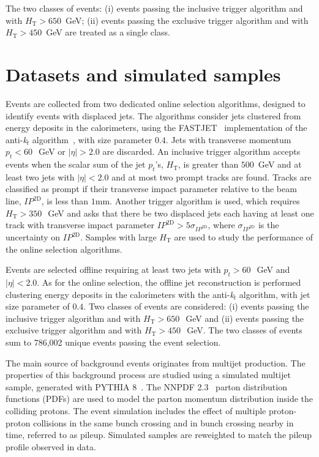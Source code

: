 The two classes of events: (i) events passing the inclusive trigger
algorithm and with $H_{\textrm{T}}>650$~GeV; (ii) events passing the
exclusive trigger algorithm and with $H_{\textrm{T}}>450$~GeV are
treated as a single class.  



\section{Datasets and simulated samples}
\label{sec:samples}

Events are collected from two dedicated online selection algorithms,
designed to identify events with displaced jets.  The algorithms
consider jets clustered from energy deposits in the calorimeters,
using the FASTJET~\cite{fastjet} implementation of the
anti-\textit{k}$_{\textit{t}}$ algorithm~\cite{Cacciari:2008gp}, with
size parameter $0.4$. Jets with transverse momentum $p_{t}<60~$~GeV or
$|\eta|>2.0$ are discarded.  An inclusive trigger algorithm accepts
events when the scalar sum of the jet $p_{t}$'s, $H_{\textrm{T}}$, is
greater than $500$~GeV and at least two jets with $|\eta|<2.0$ and at
most two prompt tracks are found. Tracks are classified as prompt if
their transverse impact parameter relative to the beam line,
$IP^{\textrm{2D}}$, is less than $1$mm.  Another trigger
algorithm is used, which requires $H_{\textrm{T}}>350~$~GeV and asks
that there be two displaced jets each having at least one track with
transverse impact parameter
$IP^{\textrm{2D}}>5\sigma_{IP^{\textrm{2D}}}$,
where $\sigma_{IP^{\textrm{2D}}}$ is the uncertainty on
$IP^{\textrm{2D}}$. Samples with large $H_{\textrm{T}}$ are used to
study the performance of the online selection algorithms. 

Events are selected offline requiring at least two jets with
$p_{t}>60~$~GeV and $|\eta|<2.0$. As for the online selection, the
offline jet reconstruction is performed clustering energy deposits in
the calorimeters with the anti-\textit{k}$_{\textit{t}}$ algorithm,
with jet size parameter of $0.4$. Two classes of events are
considered: (i) events passing the inclusive trigger algorithm and
with $H_{\textrm{T}}>650~$~GeV and (ii) events passing the exclusive
trigger algorithm and with $H_{\textrm{T}}>450~$~GeV. The two classes 
of events sum to 786,002 unique events passing the event selection.  

The main source of background events originates from multijet
production. The properties of this background process are studied
using a simulated multijet sample, generated with
PYTHIA 8~\cite{Sjostrand:2007gs}. The NNPDF 2.3~\cite{NNPDF23}
parton distribution functions (PDFs) are used to model the parton
momentum distribution inside the colliding protons. The event
simulation includes the effect of multiple proton-proton collisions in
the same bunch crossing and in bunch crossing nearby in time, referred
to as pileup. Simulated samples are reweighted to match the pileup
profile observed in data.

